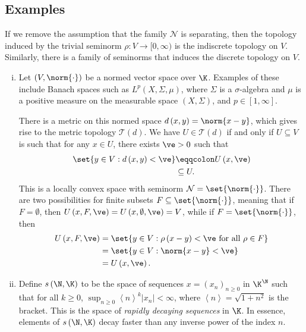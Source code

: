 \documentclass[10pt]{mypackage}
\renewcommand{\eqcolon}{\eqqcolon}
\begin{document}
\subsection{Examples}%
\begin{remark}
  If we remove the assumption that the family $\mathcal{N}$ is separating, then the topology induced by the trivial seminorm $\rho\colon V\rightarrow [0,\infty)$ is the indiscrete topology on $V$. Similarly, there is a family of seminorms that induces the discrete topology on $V$.
\end{remark}
\begin{enumerate}[(i)]
  \item Let $\left( V,\norm{\cdot} \right)$ be a normed vector space over $\K$. Examples of these include Banach spaces such as $L^p\left( X, \Sigma,\mu \right)$, where $\Sigma$ is a $\sigma$-algebra and $\mu$ is a positive measure on the measurable space $\left( X,\Sigma \right)$, and $p\in [1,\infty]$. 

    There is a metric on this normed space $d\left( x,y \right) = \norm{x-y}$, which gives rise to the metric topology $ \mathcal{T}\left( d \right) $. We have $U\in \mathcal{T}\left( d \right)$ if and only if $U\subseteq V$ is such that for any $x\in U$, there exists $\ve > 0$ such that
    \begin{align*}
      \set{y\in V : d\left( x,y \right) < \ve} &\eqcolon U\left( x,\ve \right)\\
                                               &\subseteq U.
    \end{align*}
    This is a locally convex space with seminorm $ \mathcal{N} = \set{\norm{\cdot}} $. There are two possibilities for finite subsets $F\subseteq \set{\norm{\cdot}}$, meaning that if $F = \emptyset$, then $U\left( x,F,\ve \right) = U\left( x,\emptyset,\ve \right) = V$, while if $F = \set{\norm{\cdot}}$, then
    \begin{align*}
      U\left( x,F,\ve \right) &= \set{y\in V : \rho\left( x-y \right) < \ve\text{ for all }\rho \in F}\\
                              &= \set{y\in V : \norm{x-y} < \ve}\\
                              &= U\left( x,\ve \right).
    \end{align*}
  \item Define $s \left( \N,\K \right)$ to be the space of sequences $x = \left( x_n \right)_{n\geq 0}$ in $\K^{\N}$ such that for all $ k\geq 0 $, $\sup_{n\geq 0} \left\langle n \right\rangle^{k} \left\vert x_n \right\vert < \infty$, where $ \left\langle n \right\rangle = \sqrt{1 + n^2} $ is the bracket. This is the space of \textit{rapidly decaying sequences} in $\K$. In essence, elements of $s\left( \N,\K \right)$ decay faster than any inverse power of the index $n$.


\end{enumerate}
\end{document}
